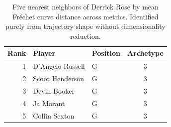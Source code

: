 \begin{table}[htbp]
  \centering\small
  \begin{tabular}{rllc}
    \toprule
    Rank & Player & Position & Archetype \\
    \midrule
    1 & D'Angelo Russell & G & 3 \\
    2 & Scoot Henderson & G & 3 \\
    3 & Devin Booker & G & 3 \\
    4 & Ja Morant & G & 3 \\
    5 & Collin Sexton & G & 3 \\
    \bottomrule
  \end{tabular}
  \caption{Five nearest neighbors of Derrick Rose by mean Fr\'{e}chet curve distance across metrics. Identified purely from trajectory shape without dimensionality reduction.}
  \label{tab:Derrick_Rose_frechet_curve_neighbors}
\end{table}

